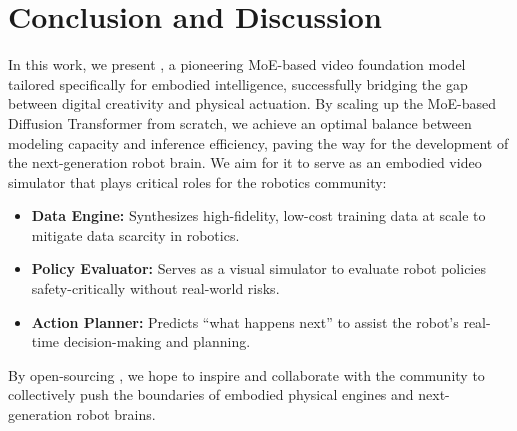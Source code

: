 \section*{Conclusion and Discussion}
In this work, we present \method, a pioneering MoE-based video foundation model tailored specifically for embodied intelligence, successfully bridging the gap between digital creativity and physical actuation. 
By scaling up the MoE-based Diffusion Transformer from scratch, we achieve an optimal balance between modeling capacity and inference efficiency, paving the way for the development of the next-generation robot brain.
We aim for it to serve as an embodied video simulator that plays critical roles for the robotics community:
\begin{itemize}
    \item \textbf{Data Engine:} Synthesizes high-fidelity, low-cost training data at scale to mitigate data scarcity in robotics.
    \item \textbf{Policy Evaluator:} Serves as a visual simulator to evaluate robot policies safety-critically without real-world risks.
    \item \textbf{Action Planner:} Predicts ``what happens next'' to assist the robot's real-time decision-making and planning.
\end{itemize}
By open-sourcing \method, we hope to inspire and collaborate with the community to collectively push the boundaries of embodied physical engines and next-generation robot brains.